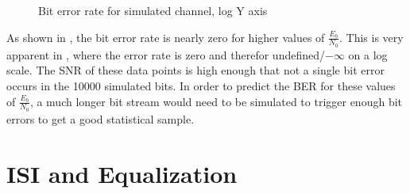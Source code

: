 \documentclass[11pt]{article}
\begin{document}
\begin{figure}[H]
    \centering
    \scalebox{0.7}{}
    \caption{Bit error rate for simulated channel, log Y axis\label{errorlog}}
\end{figure}

As shown in , the bit error rate is nearly zero for higher values of
$\frac{E_b}{N_0}$. This is very apparent in , where the error
rate is zero and therefor undefined/$-\infty$ on a log scale. The SNR of these
data points is high enough that not a single bit error occurs in the 10000
simulated bits. In order to predict the BER for these values of
$\frac{E_b}{N_0}$, a much longer bit stream would need to be simulated to
trigger enough bit errors to get a good statistical sample.

\section{ISI and Equalization}
\end{document}
